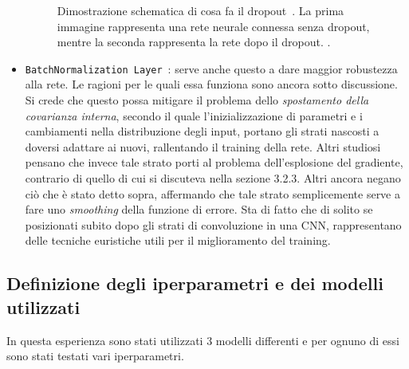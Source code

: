\begin{itemize}
\begin{figure}[H]
        \caption{\small{Dimostrazione schematica di cosa fa il dropout~\cite{dropout}. La prima immagine
         rappresenta una rete neurale connessa senza dropout, mentre la seconda rappresenta la rete dopo il dropout. .
        } %
        } %
        \label{fi:dcalc}
      \end{figure}
\item \lstinline{BatchNormalization Layer}~\cite{norm}:  serve anche questo a dare maggior robustezza alla rete.
 Le ragioni per le quali essa funziona sono ancora sotto discussione. Si crede che questo possa mitigare il problema dello \emph{spostamento della covarianza interna}, secondo il quale l’inizializzazione di parametri e i cambiamenti nella distribuzione degli input, portano gli strati nascosti a doversi adattare ai nuovi, rallentando il training della rete. Altri studiosi pensano che invece tale strato porti al problema dell’esplosione del gradiente, contrario di quello di cui si discuteva nella sezione 3.2.3. Altri ancora negano ciò che è stato detto sopra, affermando che tale strato semplicemente serve a fare uno \emph{smoothing} della funzione di errore.  Sta di fatto che di solito se posizionati subito dopo gli strati di convoluzione in una CNN, rappresentano delle tecniche euristiche utili per il miglioramento del training.
\end{itemize}
\subsection{Definizione degli iperparametri e dei modelli utilizzati}
In questa esperienza sono stati utilizzati 3 modelli differenti e per ognuno di essi sono stati testati vari iperparametri.\\



